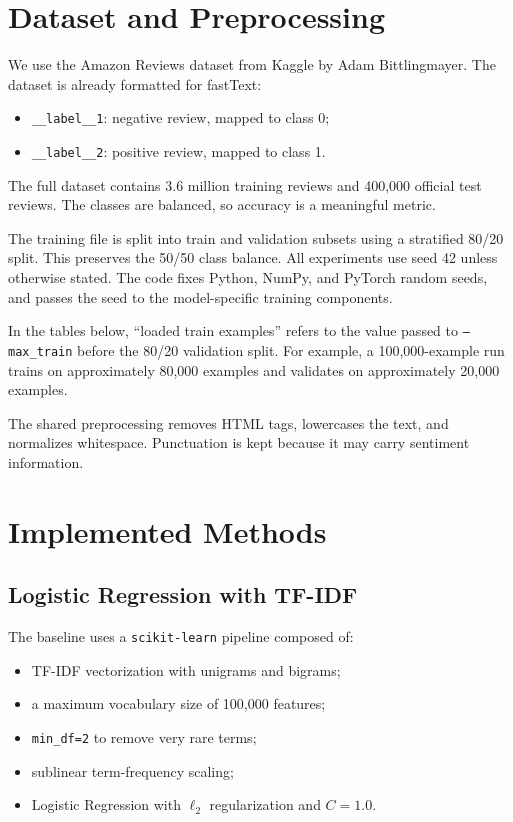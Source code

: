\documentclass[conference]{IEEEtran}
\begin{document}
\section{Dataset and Preprocessing}
We use the Amazon Reviews dataset from Kaggle by Adam Bittlingmayer. The
dataset is already formatted for fastText:
\begin{itemize}
  \item \texttt{\_\_label\_\_1}: negative review, mapped to class 0;
  \item \texttt{\_\_label\_\_2}: positive review, mapped to class 1.
\end{itemize}
The full dataset contains 3.6 million training reviews and 400,000 official test
reviews. The classes are balanced, so accuracy is a meaningful metric.

The training file is split into train and validation subsets using a stratified
80/20 split. This preserves the 50/50 class balance. All experiments use seed
42 unless otherwise stated. The code fixes Python, NumPy, and PyTorch random
seeds, and passes the seed to the model-specific training components.

In the tables below, ``loaded train examples'' refers to the value passed to
\texttt{--max\_train} before the 80/20 validation split. For example, a
100,000-example run trains on approximately 80,000 examples and validates on
approximately 20,000 examples.

The shared preprocessing removes HTML tags, lowercases the text, and normalizes
whitespace. Punctuation is kept because it may carry sentiment information.

\section{Implemented Methods}
\subsection{Logistic Regression with TF-IDF}
The baseline uses a \texttt{scikit-learn} pipeline composed of:
\begin{itemize}
  \item TF-IDF vectorization with unigrams and bigrams;
  \item a maximum vocabulary size of 100,000 features;
  \item \texttt{min\_df=2} to remove very rare terms;
  \item sublinear term-frequency scaling;
  \item Logistic Regression with $\ell_2$ regularization and $C=1.0$.
\end{itemize}
\end{document}
